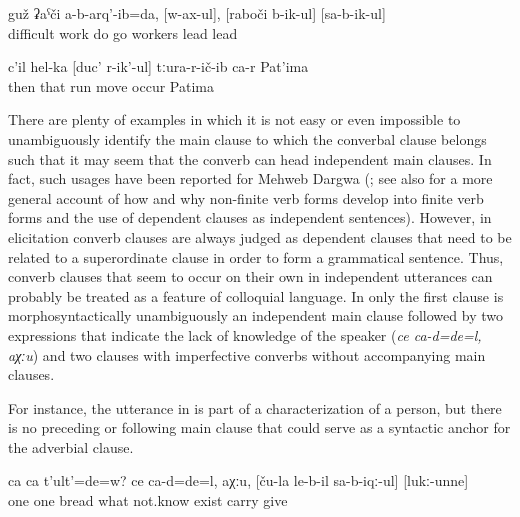 \begin{enumerate}
\begin{exe}
		\ex	\label{ex:I did not do a difficult work, driving, bringing the workers (to the wine factory) and bringing them back}
		\gll	guž	ʡaˁči	a-b-arq'-ib=da,	[w-ax-ul],	[raboči	b-ik-ul]	[sa-b-ik-ul]\\
			difficult	work	do	go workers	lead	lead\\
		\glt	{}
	
		\ex	\label{ex:Then Patima appeared outside running}
		\gll	c'il	hel-ka	[duc'	r-ik'-ul]	tːura-r-ič-ib	ca-r	Pat'ima\\
			then	that	run	move	occur		Patima\\
		\glt	{}
	\end{exe}
	
There are plenty of examples in which it is not easy or even impossible to unambiguously identify the main clause to which the converbal clause belongs such that it may seem that the converb can head independent main clauses. In fact, such usages have been reported for Mehweb Dargwa (\citet{Kustova2015}; see also \citet{Mithun2008} for a more general account of how and why non-finite verb forms develop into finite verb forms and the use of dependent clauses as independent sentences). However, in elicitation converb clauses are always judged as dependent clauses that need to be related to a superordinate clause in order to form a grammatical sentence. Thus, converb clauses that seem to occur on their own in independent utterances can probably be treated as a feature of colloquial language. In  only the first clause is morphosyntactically unambiguously an independent main clause followed by two expressions that indicate the lack of knowledge of the speaker (\textit{ce ca-d=de=l, aχːu}) and two clauses with imperfective converbs without accompanying main clauses.

For instance, the utterance in  is part of a characterization of a person, but there is no preceding or following main clause that could serve as a syntactic anchor for the adverbial clause.
	\begin{exe}
		\ex	\label{ex:‎There was bread one for everyone, whatever}
		\gll	ca	ca	t'ult'=de=w?	ce	ca-d=de=l,	aχːu,	[ču-la	le-b-il	sa-b-iqː-ul]	[lukː-unne]\\
			one	one	bread	what		not.know		exist	carry\tsc{.ipfv-icvb}	give\\
		\glt	{}
	

\end{exe}
\end{enumerate}
